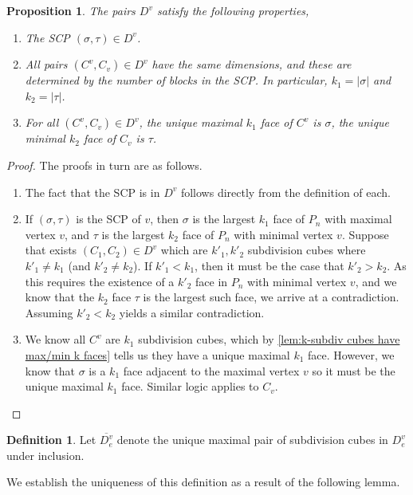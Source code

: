 \documentclass{amsart}
\newcommand{\Kurt}[1]{\todo[color=orange!30]{\rm #1 \\ \hfill --- K.}}
\newtheorem{proposition}[theorem]{Proposition}
\theoremstyle{definition}
\newtheorem{definition}[theorem]{Definition}
\newcommand{\subdivpairsev}{D_e^v}
\newcommand{\maxsubdivpairsev}{\overline{D_e^v}}
\newcommand{\subdivpairsv}{D^v}
\begin{document}
\begin{proposition}\label{prop:ev properties}
The pairs $\subdivpairsv$ satisfy the following properties,
\begin{enumerate}
    \item The SCP $(\sigma,\tau) \in \subdivpairsv$.
    \item All pairs $(C^v,C_v) \in \subdivpairsv$ have the same dimensions, and these are determined by the number of blocks in the SCP. In particular, $k_1=|\sigma|$ and $k_2 = |\tau|$. 
    \item For all $(C^v,C_v) \in \subdivpairsv$, the unique maximal $k_1$ face of $C^v$ is $\sigma$, the unique minimal $k_2$ face of $C_v$ is $\tau$.
\end{enumerate}
\end{proposition}
\begin{proof}
The proofs in turn are as follows.
\begin{enumerate}
    \item The fact that the SCP is in $\subdivpairsv$ follows directly from the definition of each.
    \item If $(\sigma,\tau)$ is the SCP of $v$, then $\sigma$ is the largest $k_1$ face of $P_n$ with maximal vertex $v$, and $\tau$ is the largest $k_2$ face of $P_n$ with minimal vertex $v$.    
    Suppose that exists $(C_1,C_2) \in \subdivpairsv$ which are $k'_1, k'_2$ subdivision cubes where $k'_1\neq k_1$ (and $k'_2\neq k_2$).
    If $k'_1< k_1$, then it must be the case that $k'_2> k_2$.
    As this requires the existence of a $k'_2$ face in $P_n$ with minimal vertex $v$, and we know that the $k_2$ face $\tau$ is the largest such face, we arrive at a contradiction.
    Assuming $k'_2<k_2$ yields a similar contradiction.
    \item We know all $C^v$ are $k_1$ subdivision cubes, which by \cref{lem:k-subdiv cubes have max/min k faces} tells us they have a unique maximal $k_1$ face.
    However, we know that $\sigma$ is a $k_1$ face adjacent to the maximal vertex $v$ so it must be the unique maximal $k_1$ face.
    Similar logic applies to $C_v$.
\end{enumerate}
\end{proof}

\begin{definition}\label{def:max subdiv pairs}
Let $\maxsubdivpairsev$ denote the unique maximal pair of subdivision cubes in $\subdivpairsev$ under inclusion.
\end{definition}
We establish the uniqueness of this definition as a result of the following lemma. \Kurt{need uniquess}
\end{document}

